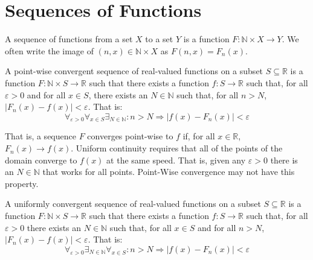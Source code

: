 \section{Sequences of Functions}
    \begin{definition}
        A sequence of functions from a
        set $X$ to a set $Y$ is a function
        $F:\mathbb{N}\times{X}\rightarrow{Y}$.
        We often write the image of
        $(n,x)\in\mathbb{N}\times{X}$ as
        $F(n,x)=F_{n}(x)$.
    \end{definition}
    \begin{definition}
        A point-wise convergent
        sequence of real-valued functions on
        a subset $S\subseteq\mathbb{R}$
        is a function
        $F:\mathbb{N}\times{S}\rightarrow\mathbb{R}$
        such that there exists a function
        $f:S\rightarrow\mathbb{R}$ such that,
        for all $\varepsilon>0$ and for all
        $x\in{S}$, there exists an
        $N\in\mathbb{N}$ such that, for all
        $n>N$, $|F_{n}(x)-f(x)|<\varepsilon$.
        That is:
        \begin{equation}
            \label{eqn:FUNCTIONAL_ANALYSIS:POINTWISE_CONV_DEF}
            \forall_{\varepsilon>0}
            \forall_{x\in{S}}
            \exists_{N\in\mathbb{N}}:
            n>N\Rightarrow
            |f(x)-F_{n}(x)|<\varepsilon
        \end{equation}
    \end{definition}
    That is, a sequence $F$ converges point-wise
    to $f$ if, for all $x\in\mathbb{R}$,
    $F_{n}(x)\rightarrow{f(x)}$.
    Uniform continuity requires that all of the
    points of the domain converge to $f(x)$ at
    the same speed. That is, given any $\varepsilon>0$
    there is an $N\in\mathbb{N}$ that works for
    all points. Point-Wise convergence may not
    have this property.
    \begin{definition}
        A uniformly convergent
        sequence of real-valued functions on
        a subset $S\subseteq\mathbb{R}$
        is a function
        $F:\mathbb{N}\times{S}\rightarrow\mathbb{R}$
        such that there exists a function
        $f:S\rightarrow\mathbb{R}$ such that,
        for all $\varepsilon>0$ there exists
        an $N\in\mathbb{N}$ such that, for all
        $x\in{S}$ and for all
        $n>N$, $|F_{n}(x)-f(x)|<\varepsilon$.
        That is:
        \begin{equation}
            \label{eqn:FUNCTIONAL_ANALYSIS:UNIFORM_CONV_DEF}
            \forall_{\varepsilon>0}
            \exists_{N\in\mathbb{N}}
            \forall_{x\in{S}}:
            n>N\Rightarrow
            |f(x)-F_{n}(x)|<\varepsilon
        \end{equation}
    \end{definition}
